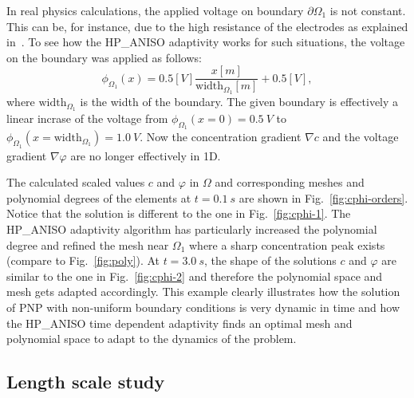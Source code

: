 In real physics calculations, the applied voltage on boundary $\partial\Omega_1$
is not constant. This can be, for instance, due to the high resistance of
the electrodes as explained in~\cite{pugal2009}.
To see how the HP\_ANISO adaptivity works for such situations, the
voltage on the boundary was applied as follows:
\begin{equation}
  \phi_{\Omega_1}\left( x \right)=0.5\left[V \right] \frac{x\left[ m \right ]}{\text{width}_{\Omega_1}\left[ m \right]}+0.5\left[ V \right],
\end{equation}
where $\text{width}_{\Omega_1}$ is the width of the boundary. The given boundary is effectively
a linear incrase of the voltage from $\phi_{\Omega_1}\left(x = 0 \right)=0.5\ V$ to
$\phi_{\Omega_1}\left(x=\text{width}_{\Omega_1}\right) = 1.0\ V$.
Now the concentration gradient $\nabla c$ and the voltage gradient $\nabla \varphi$ are no
longer effectively in 1D.

The calculated scaled values $c$ and $\varphi$ in $\Omega$ and corresponding meshes and polynomial
degrees of the elements at $t=0.1\ s$ are shown in Fig.~\ref{fig:cphi-orders}.
Notice that the solution
is different to the one in Fig.~\ref{fig:cphi-1}. The HP\_ANISO
adaptivity algorithm has particularly increased the polynomial degree
and refined the mesh near $\Omega_1$ where a sharp concentration
peak exists (compare to Fig.~\ref{fig:poly}).
At $t=3.0\ s$, the shape of the solutions $c$ and $\varphi$ are similar to the one
in Fig.~\ref{fig:cphi-2} and therefore the polynomial space and mesh gets adapted
accordingly. This example clearly illustrates how 
the solution of PNP with non-uniform
boundary conditions is very dynamic in time
and how the HP\_ANISO time dependent adaptivity 
finds an optimal mesh and polynomial space to adapt to the dynamics
of the problem. 

\subsection{Length scale study}

